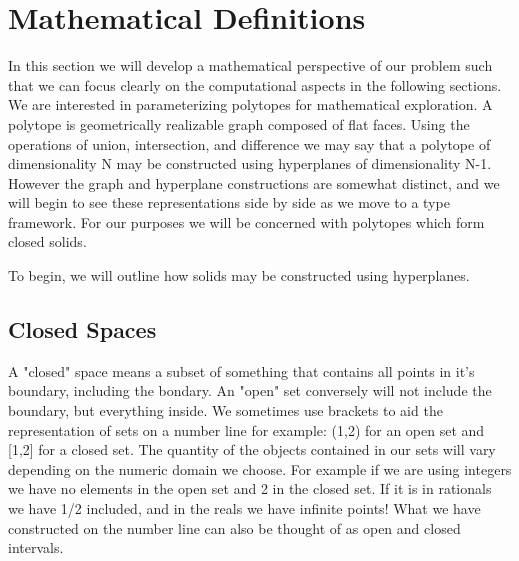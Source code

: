 
\chapter{Mathematical Definitions}

In this section we will develop a mathematical perspective of our problem
such that we can focus clearly on the computational aspects in the following
sections. We are interested in parameterizing polytopes for
mathematical exploration. A polytope is geometrically realizable graph composed
of flat faces. Using the operations of union, intersection, and difference we
may say that a polytope of dimensionality N may be constructed using
hyperplanes of dimensionality N-1.
However the graph and hyperplane constructions are somewhat
distinct, and we will begin to see these representations
side by side as we move to a type framework.
For our purposes we will be concerned with polytopes which form closed solids.

To begin, we will outline how solids may be constructed using hyperplanes.

\section{Closed Spaces}

A "closed" space means a subset of something that contains all points in it's
boundary, including the bondary. An "open" set conversely will not include
the boundary, but everything inside.
We sometimes use brackets to aid the representation of sets on a number line
for example: (1,2) for an open set and
[1,2] for a closed set. The quantity of the objects contained in our sets
will vary depending on the numeric domain we choose.
For example if we are using integers we have no
elements in the open set and 2 in the closed set. If it is in rationals we
have 1/2 included, and in the reals we have infinite points! What we have
constructed on the number line can also be thought of as open
and closed intervals.

